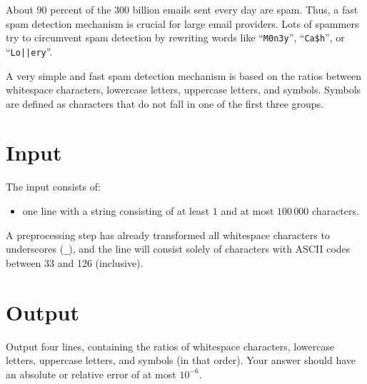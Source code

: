 
%
\noindent
About $90$ percent of the 300 billion emails sent every day are spam. Thus, a
fast spam detection mechanism is crucial for large email providers. Lots of spammers try
to circumvent spam detection by rewriting words like
``{\tt M0n3y}'', ``{\tt Ca\$h}'', or ``{\tt Lo||ery}''.

A very simple and fast spam detection mechanism is based on the ratios between
whitespace characters, lowercase letters, uppercase letters, and symbols. Symbols are
defined as characters that do not fall in one of the first three groups.

\section*{Input}

The input consists of:
\begin{itemize}
	\item one line with a string consisting of at least $1$ and at most $100\,000$ characters.
\end{itemize}
A preprocessing step has already transformed all whitespace characters to
underscores ({\tt\_}), and the line will consist solely of characters with ASCII codes between 33 and 126 (inclusive).

\section*{Output}

Output four lines, containing the ratios of whitespace characters, lowercase
letters, uppercase letters, and symbols (in that order). 
Your answer should have an absolute or relative error of at most $10^{-6}$.
